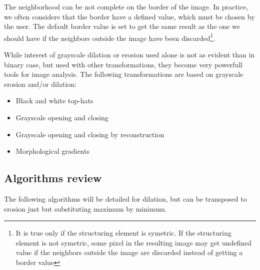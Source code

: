 \documentclass{InsightArticle}
\begin{document}
The neighborhood can be not complete on the border of the image. In practice,
we often considere that the border have a defined value, which must be chosen
by the user. The default border value is set to get the same result as the
one we should have if the neighbors outside the image have been discarded\footnote{
It is true only if the structuring element is symetric. If the structuring element
is not symetric, some pixel in the resulting image may get undefined value
if the neighbors outside the image are discarded instead of getting a border
value}.

While interest of grayscale dilation or erosion used alone is not as evident
than in binary case, but used with other transformations, they become very powerfull
tools for image analysis. The following transformations are based on grayscale
erosion and/or dilation:
\begin{itemize}

  \item Black and white top-hats

  \item Grayscale opening and closing

  \item Grayscale opening and closing by reconstruction

  \item Morphological gradients

\end{itemize}


  \subsection{Algorithms review}

The following algorithms will be detailed for dilation, but can be transposed to
erosion just but substituting maximum by minimum.
\end{document}
